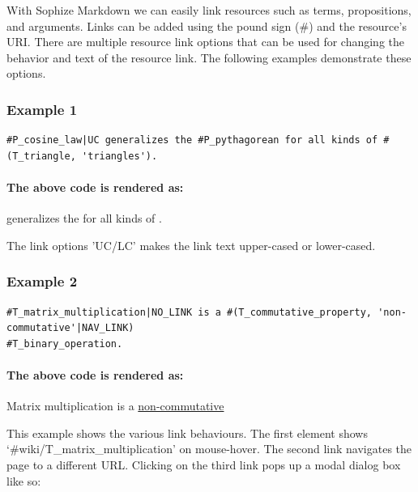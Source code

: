 \documentclass[a4paper]{article}
\begin{document}
With Sophize Markdown we can easily link resources such as terms, propositions, and arguments. Links can be added using the pound sign (\#) and the resource's URI. There are multiple resource link options that can be used for changing the behavior and text of the resource link. The following examples demonstrate these options.

\subsubsection*{Example 1}
\begin{verbatim}
#P_cosine_law|UC generalizes the #P_pythagorean for all kinds of #(T_triangle, 'triangles').
\end{verbatim}

\paragraph{The above code is rendered as:}
\begin{mdframed}
 generalizes the  for all kinds of .
\end{mdframed}

The link options 'UC/LC' makes the link text upper-cased or lower-cased.

\subsubsection*{Example 2}
\begin{verbatim}
#T_matrix_multiplication|NO_LINK is a #(T_commutative_property, 'non-commutative'|NAV_LINK)
#T_binary_operation.
\end{verbatim}

\paragraph{The above code is rendered as:}
\begin{mdframed}
Matrix multiplication is a \underline{non-commutative} 
\end{mdframed}
This example shows the various link behaviours. The first element shows `\#wiki/T\_matrix\_multiplication' on mouse-hover. The second link navigates the page to a different URL. Clicking on the third link pops up a modal dialog box like so:
\end{document}
